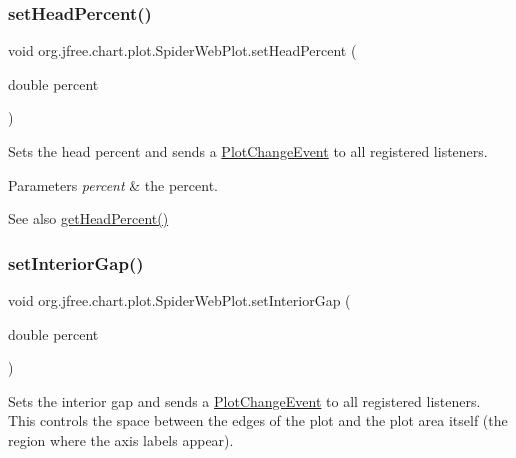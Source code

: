 \subsubsection{\texorpdfstring{set\+Head\+Percent()}{setHeadPercent()}}
{\footnotesize\ttfamily void org.\+jfree.\+chart.\+plot.\+Spider\+Web\+Plot.\+set\+Head\+Percent (\begin{DoxyParamCaption}\item[{double}]{percent }\end{DoxyParamCaption})}

Sets the head percent and sends a \mbox{\hyperlink{}{Plot\+Change\+Event}} to all registered listeners.


\begin{DoxyParams}{Parameters}
{\em percent} & the percent.\\
\hline
\end{DoxyParams}
\begin{DoxySeeAlso}{See also}
\mbox{\hyperlink{classorg_1_1jfree_1_1chart_1_1plot_1_1_spider_web_plot_a719092ea7539720554b6716f1cd48a16}{get\+Head\+Percent()}} 
\end{DoxySeeAlso}
\mbox{\label{classorg_1_1jfree_1_1chart_1_1plot_1_1_spider_web_plot_aa1d77acd75dcfc16982750d3ec686a67}} 
\subsubsection{\texorpdfstring{set\+Interior\+Gap()}{setInteriorGap()}}
{\footnotesize\ttfamily void org.\+jfree.\+chart.\+plot.\+Spider\+Web\+Plot.\+set\+Interior\+Gap (\begin{DoxyParamCaption}\item[{double}]{percent }\end{DoxyParamCaption})}

Sets the interior gap and sends a \mbox{\hyperlink{}{Plot\+Change\+Event}} to all registered listeners. This controls the space between the edges of the plot and the plot area itself (the region where the axis labels appear).



